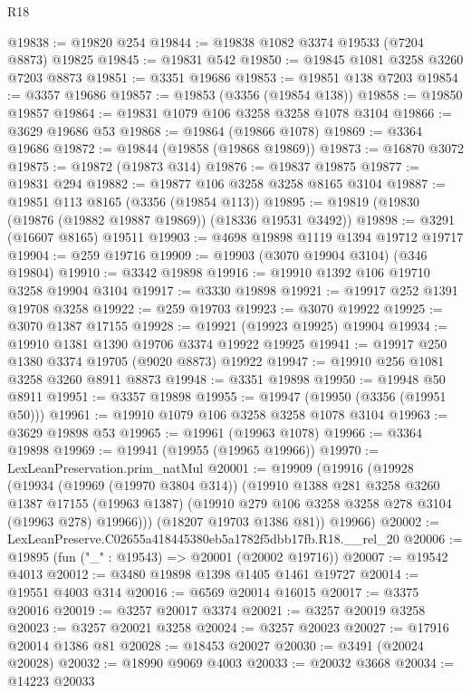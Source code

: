 \begin{lexlean}{R18}
\begin{coremodule}
@19838 := @19820 @254
@19844 := @19838 @1082 @3374 @19533 (@7204 @8873) @19825
@19845 := @19831 @542
@19850 := @19845 @1081 @3258 @3260 @7203 @8873
@19851 := @3351 @19686
@19853 := @19851 @138 @7203
@19854 := @3357 @19686
@19857 := @19853 (@3356 (@19854 @138))
@19858 := @19850 @19857
@19864 := @19831 @1079 @106 @3258 @3258 @1078 @3104
@19866 := @3629 @19686 @53
@19868 := @19864 (@19866 @1078)
@19869 := @3364 @19686
@19872 := @19844 (@19858 (@19868 @19869))
@19873 := @16870 @3072
@19875 := @19872 (@19873 @314)
@19876 := @19837 @19875
@19877 := @19831 @294
@19882 := @19877 @106 @3258 @3258 @8165 @3104
@19887 := @19851 @113 @8165 (@3356 (@19854 @113))
@19895 := @19819 (@19830 (@19876 (@19882 @19887 @19869)) (@18336 @19531 @3492))
@19898 := @3291 (@16607 @8165) @19511
@19903 := @4698 @19898 @1119 @1394 @19712 @19717
@19904 := @259 @19716
@19909 := @19903 (@3070 @19904 @3104) (@346 @19804)
@19910 := @3342 @19898
@19916 := @19910 @1392 @106 @19710 @3258 @19904 @3104
@19917 := @3330 @19898
@19921 := @19917 @252 @1391 @19708 @3258
@19922 := @259 @19703
@19923 := @3070 @19922
@19925 := @3070 @1387 @17155
@19928 := @19921 (@19923 @19925) @19904
@19934 := @19910 @1381 @1390 @19706 @3374 @19922 @19925
@19941 := @19917 @250 @1380 @3374 @19705 (@9020 @8873) @19922
@19947 := @19910 @256 @1081 @3258 @3260 @8911 @8873
@19948 := @3351 @19898
@19950 := @19948 @50 @8911
@19951 := @3357 @19898
@19955 := @19947 (@19950 (@3356 (@19951 @50)))
@19961 := @19910 @1079 @106 @3258 @3258 @1078 @3104
@19963 := @3629 @19898 @53
@19965 := @19961 (@19963 @1078)
@19966 := @3364 @19898
@19969 := @19941 (@19955 (@19965 @19966))
@19970 := LexLeanPreservation.prim_natMul
@20001 := @19909
    (@19916
      (@19928
        (@19934
          (@19969 (@19970 @3804 @314))
          (@19910
            @1388
            @281
            @3258
            @3260
            @1387
            @17155
            (@19963 @1387)
            (@19910 @279 @106 @3258 @3258 @278 @3104 (@19963 @278) @19966)))
        (@18207 @19703 @1386 @81))
      @19966)
@20002 := LexLeanPreserve.C02655a418445380eb5a1782f5dbb17fb.R18.__rel_20
@20006 := @19895 (fun ("_" : @19543) => @20001 (@20002 @19716))
@20007 := @19542 @4013
@20012 := @3480 @19898 @1398 @1405 @1461 @19727
@20014 := @19551 @4003 @314
@20016 := @6569 @20014 @16015
@20017 := @3375 @20016
@20019 := @3257 @20017 @3374
@20021 := @3257 @20019 @3258
@20023 := @3257 @20021 @3258
@20024 := @3257 @20023
@20027 := @17916 @20014 @1386 @81
@20028 := @18453 @20027
@20030 := @3491 (@20024 @20028)
@20032 := @18990 @9069 @4003
@20033 := @20032 @3668
@20034 := @14223 @20033

\end{coremodule}
\end{lexlean}
